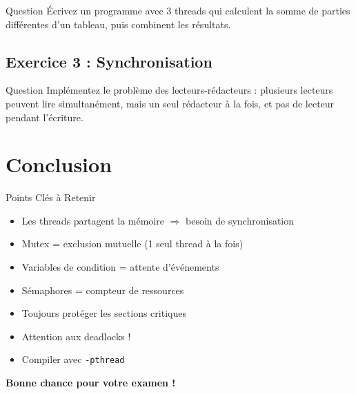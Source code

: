 \documentclass[11pt,a4paper]{article}
\begin{document}
\begin{examplebox}{Question}
Écrivez un programme avec 3 threads qui calculent la somme de parties différentes d'un tableau, puis combinent les résultats.
\end{examplebox}

\subsection{Exercice 3 : Synchronisation}

\begin{examplebox}{Question}
Implémentez le problème des lecteurs-rédacteurs : plusieurs lecteurs peuvent lire simultanément, mais un seul rédacteur à la fois, et pas de lecteur pendant l'écriture.
\end{examplebox}

\section{Conclusion}

\begin{importantbox}{Points Clés à Retenir}
\begin{itemize}
    \item Les threads partagent la mémoire $\Rightarrow$ besoin de synchronisation
    \item Mutex = exclusion mutuelle (1 seul thread à la fois)
    \item Variables de condition = attente d'événements
    \item Sémaphores = compteur de ressources
    \item Toujours protéger les sections critiques
    \item Attention aux deadlocks !
    \item Compiler avec \texttt{-pthread}
\end{itemize}
\end{importantbox}

\vfill

\begin{center}
\Large\textbf{Bonne chance pour votre examen !}
\end{center}
\end{document}

